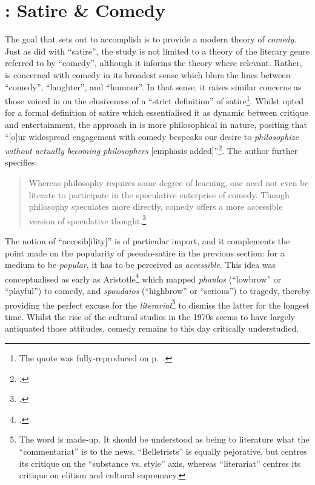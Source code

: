 \documentclass[
,a4paper
,DIV=12
,12pt
,abstract
,bibliography=totoc
]{scrartcl}
\begin{document}
\section{\textcite{mcgowan2017}: Satire \& Comedy}

The goal that \textcite{mcgowan2017} sets out to accomplish is to provide a modern theory of \emph{comedy}.  Just as \textcite{declercq2018} did with \enquote{satire}, the study is not limited to a theory of the literary genre referred to by \enquote{comedy}, although it informs the theory where relevant.  Rather, \textcite{mcgowan2017} is concerned with comedy in its broadest sense which blurs the lines between \enquote{comedy}, \enquote{laughter}, and \enquote{humour}.  In that sense, it raises similar concerns as those voiced in \textcite{elliott1962} on the elusiveness of a \enquote{strict definition} of satire\footnote{The quote was fully-reproduced on p.~\pageref{quote-satire-elusive}.}.  Whilst \textcite{declercq2018} opted for a formal definition of satire which essentialised it as dynamic between critique and entertainment, the approach in \textcite{mcgowan2017} is more philosophical in nature, positing that \enquote{[o]ur widespread engagement with comedy bespeaks our desire to \emph{philosophize without actually becoming philosophers} [emphasis added]}\footnote{\Cite[179]{mcgowan2017}.}.  The author further specifies:

\begin{quote}
  Whereas philosophy requires some degree of learning, one need not even be literate to participate in the speculative enterprise of comedy. Though philosophy speculates more directly, comedy offers a more accessible version of speculative thought.\footnote{\Cite[179--180]{mcgowan2017}.}
\end{quote}
The notion of \enquote{accesib[ility]} is of particular import, and it complements the point made on the popularity of pseudo-satire in the previous section: for a medium to be \emph{popular}, it has to be perceived as \emph{accessible}.  This idea was conceptualised as early as Aristotle\footnote{\Cite{aristotle2004}.} which mapped \emph{phaulos} (\enquote{lowbrow} or \enquote{playful}) to comedy, and \emph{spoudaios} (\enquote{highbrow} or \enquote{serious}) to tragedy, thereby providing the perfect excuse for the \emph{literariat}\footnote{The word is made-up.  It should be understood as being to literature what the \enquote{commentariat} is to the news.  \enquote{Belletrists} is equally pejorative, but centres its critique on the \enquote{substance vs. style} axis, whereas \enquote{literariat} centres its critique on elitism and cultural supremacy.} to dismiss the latter for the longest time.  Whilst the rise of the cultural studies in the 1970s seems to have largely antiquated those attitudes, comedy remains to this day critically understudied.
\end{document}
